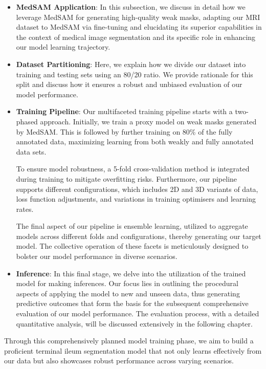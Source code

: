 \begin{itemize}
\item \textbf{MedSAM Application}:
In this subsection, we discuss in detail how we leverage MedSAM for generating high-quality weak masks, adapting our MRI dataset to MedSAM via fine-tuning and elucidating its superior capabilities in the context of medical image segmentation and its specific role in enhancing our model learning trajectory.

\item \textbf{Dataset Partitioning}:
Here, we explain how we divide our dataset into training and testing sets using an 80/20 ratio. We provide rationale for this split and discuss how it ensures a robust and unbiased evaluation of our model performance.

\item \textbf{Training Pipeline}:
Our multifaceted training pipeline starts with a two-phased approach. Initially, we train a proxy model on weak masks generated by MedSAM. This is followed by further training on 80\% of the fully annotated data, maximizing learning from both weakly and fully annotated data sets.

To ensure model robustness, a 5-fold cross-validation method is integrated during training to mitigate overfitting risks. Furthermore, our pipeline supports different configurations, which includes 2D and 3D variants of data, loss function adjustments, and variations in training optimisers and learning rates.

The final aspect of our pipeline is ensemble learning, utilized to aggregate models across different folds and configurations, thereby generating our target model. The collective operation of these facets is meticulously designed to bolster our model performance in diverse scenarios.

\item \textbf{Inference}:
In this final stage, we delve into the utilization of the trained model for making inferences. Our focus lies in outlining the procedural aspects of applying the model to new and unseen data, thus generating predictive outcomes that form the basis for the subsequent comprehensive evaluation of our model performance. The evaluation process, with a detailed quantitative analysis, will be discussed extensively in the following chapter.
\end{itemize}

Through this comprehensively planned model training phase, we aim to build a proficient terminal ileum segmentation model that not only learns effectively from our data but also showcases robust performance across varying scenarios.

